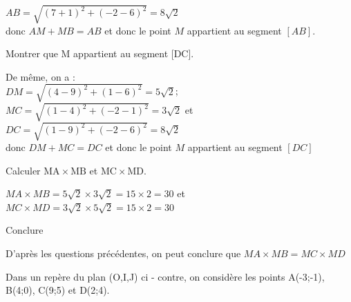 \documentclass[11pt,a4paper]{article}  %
\begin{document}
\begin{enumMet}
\begin{enumMet}
\begin{corrBox}
			$A B=\sqrt{(7+1)^{2}+(-2-6)^{2}}=8 \sqrt{2}$\\
			donc $A M+M B=A B$ et donc le point $M$ appartient au segment $[A B] .$
		\end{corrBox}
		\item Montrer que $\mathrm{M}$ appartient au segment [DC].\\
		\begin{corrBox}
			De même, on a :\\
			$D M=\sqrt{(4-9)^{2}+(1-6)^{2}}=5 \sqrt{2}$;\\
			$M C=\sqrt{(1-4)^{2}+(-2-1)^{2}}=3 \sqrt{2}$ et\\
			$D C=\sqrt{(1-9)^{2}+(-2-6)^{2}}=8 \sqrt{2}$\\
			donc $D M+M C=D C$ et donc le point $M$ appartient au segment $[D C]$ 
		\end{corrBox}
		\item Calculer $\mathrm{MA} \times \mathrm{MB}$ et $\mathrm{MC} \times \mathrm{MD}$.\\
		\begin{corrBox}
			$M A \times M B=5 \sqrt{2} \times 3 \sqrt{2}=15 \times 2=30$ et\\
			$M C \times M D=3 \sqrt{2} \times 5 \sqrt{2}=15 \times 2=30$
		\end{corrBox}
		\item Conclure\\
		\begin{corrBox}
			D'après les questions précédentes, on peut conclure que $M A \times M B=M C \times M D$
		\end{corrBox}
	\end{enumMet} 
\end{enumMet}


Dans un repère du plan (O,I,J) ci - contre, on considère les points A(-3;-1), B(4;0), C(9;5) et D(2;4).
\end{document}
